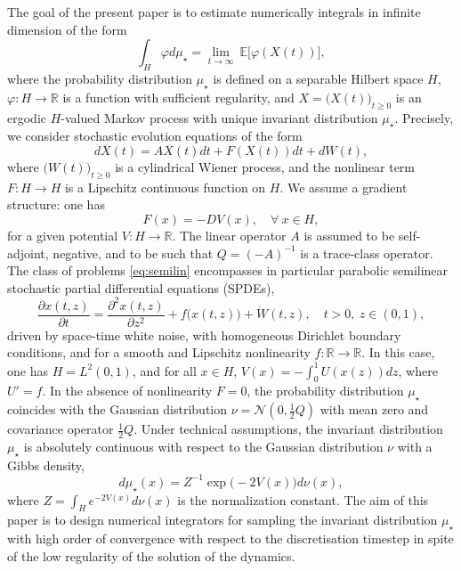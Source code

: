\documentclass[11pt]{amsart}
\newcommand{\E}{\mathbb{E}}
\newcommand{\R}{\mathbb{R}}
\begin{document}
The goal of the present paper is to estimate numerically integrals in infinite dimension of the form
\[
\int_H \varphi d\mu_\star=\underset{t\to\infty}\lim~\E\bigl[\varphi(X(t))\bigr],
\]
where the probability distribution $\mu_\star$ is defined on a separable Hilbert space $H$, $\varphi:H\to\R$ is a function with sufficient regularity, and $X=\bigl(X(t)\bigr)_{t\ge 0}$ is an ergodic $H$-valued Markov process with unique invariant distribution $\mu_\star$. Precisely, we consider stochastic evolution equations of the form
\begin{equation}\label{eq:semilin}
dX(t)=AX(t)dt+F(X(t))dt+dW(t),
\end{equation}
where $\bigl(W(t)\bigr)_{t\ge 0}$ is a cylindrical Wiener process, and the nonlinear term $F:H\to H$ is a Lipschitz continuous function on $H$. We assume a gradient structure: one has
\[
F(x)=-DV(x),\quad\forall~x\in H,
\]
for a given potential $V:H\to \R$. The linear operator $A$ is assumed to be self-adjoint, negative, and to be such that $Q=(-A)^{-1}$ is a trace-class operator.
%
The class of problems \eqref{eq:semilin} encompasses in particular parabolic semilinear stochastic partial differential equations (SPDEs),
\begin{equation} \label{eq:heat1d}
\frac{\partial x(t,z)}{\partial t}=\frac{\partial^2 x(t,z)}{\partial z^2}+f\bigl(x(t,z)\bigr)+\dot{W}(t,z),\quad t>0,~z\in(0,1),
\end{equation}
driven by space-time white noise, with homogeneous Dirichlet boundary conditions, and for a smooth and Lipschitz nonlinearity $f:\R\rightarrow \R$. In this case, one has $H=L^2(0,1)$, and for all $x\in H$, $V(x)=-\int_{0}^{1}U(x(z))dz$, where $U'=f$.
%
In the absence of nonlinearity $F=0$, the probability distribution $\mu_\star$ coincides with the Gaussian distribution $\nu=\mathcal{N}(0,\frac12 Q)$ with mean zero and covariance operator $\frac12 Q$. Under technical assumptions, the invariant distribution $\mu_\star$ is absolutely continuous with respect to the Gaussian distribution $\nu$ with a Gibbs density,
\begin{equation} \label{eq:def_mu_star}
d\mu_\star(x)=Z^{-1}\exp\bigl(-2V(x)\bigr)d\nu(x),
\end{equation}
where $Z=\int_H e^{-2V(x)}d\nu(x)$ is the normalization constant.
The aim of this paper is to design numerical integrators for sampling the invariant distribution $\mu_\star$ with high order of convergence with respect to the discretisation timestep in spite of the low regularity of the solution of the dynamics.
\end{document}
